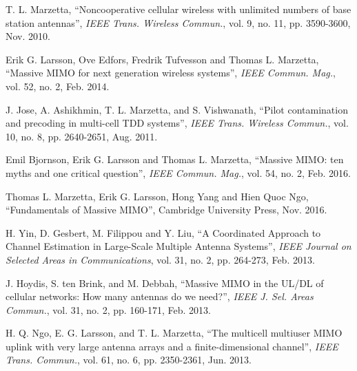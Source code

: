 \documentclass[journal,12pt,onecolumn]{IEEEtran}
\begin{document}
\begin{thebibliography}{1}

T. L. Marzetta, \textquotedblleft{Noncooperative cellular wireless with unlimited numbers of base station antennas\textquotedblright}, \emph{IEEE Trans. Wireless Commun.}, vol. 9, no. 11, pp. 3590-3600, Nov. 2010.

Erik G. Larsson, Ove Edfors, Fredrik Tufvesson and Thomas L. Marzetta, \textquotedblleft{Massive MIMO for next generation wireless systems\textquotedblright}, \emph{IEEE Commun. Mag.}, vol. 52, no. 2, Feb. 2014.

J. Jose, A. Ashikhmin, T. L. Marzetta, and S. Vishwanath, \textquotedblleft{Pilot contamination and precoding in multi-cell TDD systems\textquotedblright},  \emph{IEEE Trans. Wireless Commun.}, vol. 10, no. 8, pp. 2640-2651, Aug. 2011.

Emil Bjornson, Erik G. Larsson and Thomas L. Marzetta, \textquotedblleft{Massive MIMO: ten myths and one critical question\textquotedblright}, \emph{IEEE Commun. Mag.}, vol. 54, no. 2, Feb. 2016.

Thomas L. Marzetta, Erik G. Larsson, Hong Yang and Hien Quoc Ngo, \textquotedblleft{Fundamentals of Massive MIMO\textquotedblright}, Cambridge University Press, Nov. 2016.

H. Yin, D. Gesbert, M. Filippou and Y. Liu, \textquotedblleft{A Coordinated Approach to Channel Estimation in Large-Scale Multiple Antenna Systems\textquotedblright}, \emph{IEEE Journal on Selected Areas in Communications}, vol. 31, no. 2, pp. 264-273, Feb. 2013.

J. Hoydis, S. ten Brink, and M. Debbah, \textquotedblleft{Massive MIMO in the UL/DL of cellular networks: How many antennas do we need?\textquotedblright}, \emph{IEEE J. Sel. Areas Commun.}, vol. 31, no. 2, pp. 160-171, Feb. 2013.

H. Q. Ngo, E. G. Larsson, and T. L. Marzetta, \textquotedblleft{The multicell multiuser MIMO uplink with very large antenna arrays and a finite-dimensional channel\textquotedblright}, \emph{IEEE Trans. Commun.}, vol. 61, no. 6, pp. 2350-2361, Jun. 2013.


\end{thebibliography}
\end{document}
